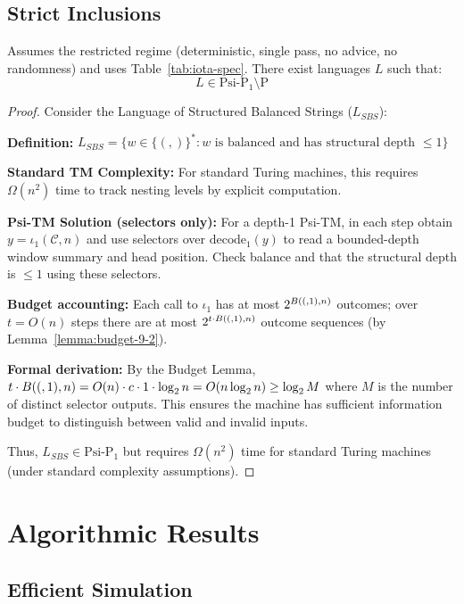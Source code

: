 \subsection{Strict Inclusions}

\begin{theorem}
Assumes the restricted regime (deterministic, single pass, no advice, no randomness) and uses Table~\ref{tab:iota-spec}.
There exist languages $L$ such that:
$$L \in \text{Psi-P}_1 \setminus \text{P}$$
\end{theorem}

\begin{proof}
Consider the Language of Structured Balanced Strings ($L_{SBS}$):

\textbf{Definition:} $L_{SBS} = \{w \in \{(,)\}^* : w \text{ is balanced and has structural depth } \leq 1\}$

\textbf{Standard TM Complexity:}
For standard Turing machines, this requires $\Omega(n^2)$ time to track nesting levels by explicit computation.

\textbf{Psi-TM Solution (selectors only):}
For a depth-1 Psi-TM, in each step obtain $y=\iota_1(\mathcal{C},n)$ and use selectors over $\mathrm{decode}_1(y)$ to read a bounded-depth window summary and head position. Check balance and that the structural depth is $\le 1$ using these selectors.

\textbf{Budget accounting:}
Each call to $\iota_1$ has at most $2^{B((,1),n)}$ outcomes; over $t=O(n)$ steps there are at most $2^{t\cdot B((,1),n)}$ outcome sequences (by Lemma~\ref{lemma:budget-9-2}).

\textbf{Formal derivation:} By the Budget Lemma, $t \cdot \B(1,n) = O(n) \cdot c \cdot 1 \cdot \log n = O(n \log n) \ge \log M$ where $M$ is the number of distinct selector outputs. This ensures the machine has sufficient information budget to distinguish between valid and invalid inputs.

Thus, $L_{SBS} \in \text{Psi-P}_1$ but requires $\Omega(n^2)$ time for standard Turing machines (under standard complexity assumptions).
\end{proof}

\section{Algorithmic Results}

\subsection{Efficient Simulation}

